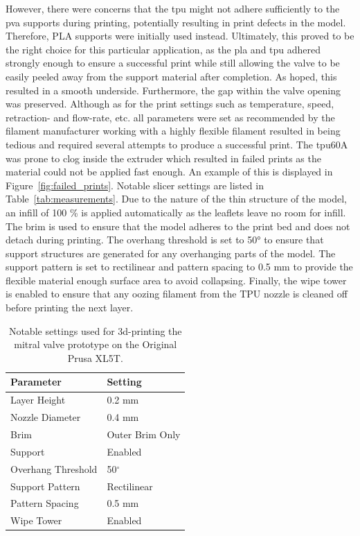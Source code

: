 However, there were concerns that the \gls{tpu} might not adhere sufficiently to the \gls{pva} supports during printing, potentially resulting in print defects in the model. Therefore, PLA supports were initially used instead. Ultimately, this proved to be the right choice for this particular application, as the \gls{pla} and \gls{tpu} adhered strongly enough to ensure a successful print while still allowing the valve to be easily peeled away from the support material after completion. As hoped, this resulted in a smooth underside. Furthermore, the gap within the valve opening was preserved. Although as for the print settings such as temperature, speed, retraction- and flow-rate, etc. all parameters were set as recommended by the filament manufacturer \cite{recreusFilamentFilaflex60} working with a highly flexible filament resulted in being tedious and required several attempts to produce a successful print. The \gls{tpu}60A was prone to clog inside the extruder which resulted in failed prints as the material could not be applied fast enough. An example of this is displayed in Figure~\ref{fig:failed_prints}. Notable slicer settings are listed in Table~\ref{tab:measurements}. Due to the nature of the thin structure of the model, an infill of 100 \% is applied automatically as the leaflets leave no room for infill. The brim is used to ensure that the model adheres to the print bed and does not detach during printing. The overhang threshold is set to 50° to ensure that support structures are generated for any overhanging parts of the model. The support pattern is set to rectilinear and pattern spacing to 0.5 mm to provide the flexible material enough surface area to avoid collapsing. Finally, the wipe tower is enabled to ensure that any oozing filament from the TPU nozzle is cleaned off before printing the next layer.

\begin{table}[htbp]
\centering
\caption{Notable settings used for \gls{3d}-printing the mitral valve prototype on the Original Prusa XL5T.}
\label{tab:settings}
\begin{tabular}{|l|l|}
\hline
\textbf{Parameter} & \textbf{Setting} \\
\hline
Layer Height & 0.2 mm \\
Nozzle Diameter & 0.4 mm \\
Brim & Outer Brim Only \\
Support & Enabled \\
Overhang Threshold & 50$^\circ$ \\
Support Pattern & Rectilinear \\
Pattern Spacing & 0.5 mm \\
Wipe Tower & Enabled \\
\hline
\end{tabular}
\end{table}

